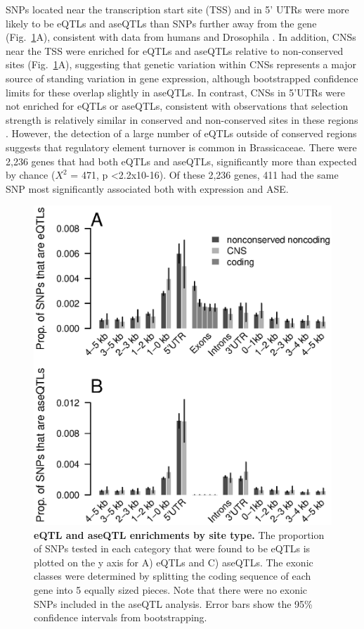 SNPs located near the transcription start site (TSS) and in 5’ UTRs were more likely to be eQTLs and aseQTLs than SNPs further away from the gene (Fig.~\ref{fig:3fig2}A), consistent with data from humans and Drosophila \citep{Massouras2012-wq,Pickrell2010-ci,Battle2014-ke}. In addition, CNSs near the TSS were enriched for eQTLs and aseQTLs relative to non-conserved sites (Fig.~\ref{fig:3fig2}A), suggesting that genetic variation within CNSs represents a major source of standing variation in gene expression, although bootstrapped confidence limits for these overlap slightly in aseQTLs. In contrast, CNSs in 5’UTRs were not enriched for eQTLs or aseQTLs, consistent with observations that selection strength is relatively similar in conserved and non-conserved sites in these regions \citep{Haudry2013-qe}. However, the detection of a large number of eQTLs outside of conserved regions suggests that regulatory element turnover is common in Brassicaceae. There were 2,236 genes that had both eQTLs and aseQTLs, significantly more than expected by chance ($X^{2}$ = 471, p \textless 2.2x10-16). Of these 2,236 genes, 411 had the same SNP most significantly associated both with expression and ASE.

\begin{figure}[ht!]
      \centering
       \includegraphics[width=\linewidth]{Ch3Fig2}
    \caption{\textbf{eQTL and aseQTL enrichments by site type.} The proportion of SNPs tested in each category that were found to be eQTLs is plotted on the y axis for A) eQTLs and C) aseQTLs. The exonic classes were determined by splitting the coding sequence of each gene into 5 equally sized pieces. Note that there were no exonic SNPs included in the aseQTL analysis. Error bars show the 95\% confidence intervals from bootstrapping.}
    \label{fig:3fig2}
\end{figure}

